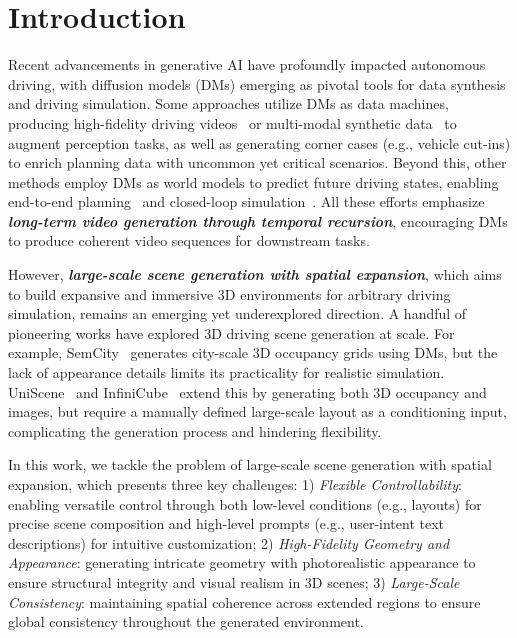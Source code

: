 \section{Introduction}

Recent advancements in generative AI have profoundly impacted autonomous driving, with diffusion models (DMs) emerging as pivotal tools for data synthesis and driving simulation. Some approaches utilize DMs as data machines, producing high-fidelity driving videos~\cite{MagicDrive, Vista, DriveDreamer, DrivingDiffusion, Panacea, SubjectDrive, MagicDriveDiT, SyntheOcc, CogDriving, DriveScape, DiVE, UniMLVG, CoGen, Glad} or multi-modal synthetic data~\cite{X-Drive, HoloDrive, WoVoGen, UniScene} to augment perception tasks, as well as generating corner cases (e.g., vehicle cut-ins) to enrich planning data with uncommon yet critical scenarios. Beyond this, other methods employ DMs as world models to predict future driving states, enabling end-to-end planning~\cite{Drive-WM, Delphi, UMGen} and closed-loop simulation~\cite{DriveArena, DreamForge, DrivingSphere, ReconDreamer, SceneCrafter, Stag-1, ge2025}. All these efforts emphasize \textbf{\emph{long-term video generation through temporal recursion}}, encouraging DMs to produce coherent video sequences for downstream tasks.

However, \textbf{\emph{large-scale scene generation with spatial expansion}}, which aims to build expansive and immersive 3D environments for arbitrary driving simulation, remains an emerging yet underexplored direction. A handful of pioneering works have explored 3D driving scene generation at scale. For example, SemCity~\cite{SemCity} generates city-scale 3D occupancy grids using DMs, but the lack of appearance details limits its practicality for realistic simulation. UniScene~\cite{UniScene} and InfiniCube~\cite{InfiniCube} extend this by generating both 3D occupancy and images, but require a manually defined large-scale layout as a conditioning input, complicating the generation process and hindering flexibility.



In this work, we tackle the problem of large-scale scene generation with spatial expansion, which presents three key challenges:
1) \emph{Flexible Controllability}: enabling versatile control through both low-level conditions (e.g., layouts) for precise scene composition and high-level prompts (e.g., user-intent text descriptions) for intuitive customization;
2) \emph{High-Fidelity Geometry and Appearance}: generating intricate geometry with photorealistic appearance to ensure structural integrity and visual realism in 3D scenes;
3) \emph{Large-Scale Consistency}: maintaining spatial coherence across extended regions to ensure global consistency throughout the generated environment.

